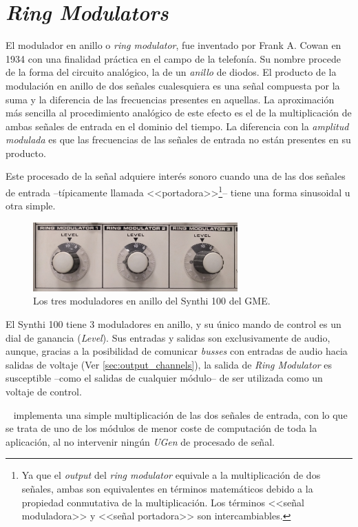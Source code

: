 \section[Ring Modulators]{\textit{Ring Modulators}}
\label{sec:ring_modulators}

El modulador en anillo o \textit{ring modulator}, fue inventado por Frank A. Cowan en 1934 con una finalidad práctica en el campo de la telefonía. Su nombre procede de la forma del circuito analógico, la de un \textit{anillo} de diodos. El producto de la modulación en anillo de dos señales cualesquiera es una señal compuesta por la suma y la diferencia de las frecuencias presentes en aquellas. La aproximación más sencilla al procedimiento analógico de este efecto es el de la multiplicación de ambas señales de entrada en el dominio del tiempo. La diferencia con la \textit{amplitud modulada} es que las frecuencias de las señales de entrada no están presentes en su producto. 

Este procesado de la señal adquiere interés sonoro cuando una de las dos señales de entrada --típicamente llamada <<portadora>>\footnote{Ya que el \textit{output} del \textit{ring modulator} equivale a la multiplicación de dos señales, ambas son equivalentes en términos matemáticos debido a la propiedad conmutativa de la multiplicación. Los términos <<señal moduladora>> y <<señal portadora>> son intercambiables.}-- tiene una forma sinusoidal u otra simple. 

\begin{figure}
	\centering
	\includegraphics[width=0.7\textwidth]{images/ring_modulators}
	\caption[\textit{Ring Modulators}]{Los tres moduladores en anillo del Synthi 100 del GME.}
	\label{fig:ring_modulators}
\end{figure}

El Synthi 100 tiene 3 moduladores en anillo, y su único mando de control es un dial de ganancia (\textit{Level}). Sus entradas y salidas son exclusivamente de audio, aunque, gracias a la posibilidad de comunicar \textit{busses} con entradas de audio hacia salidas de voltaje (Ver \ref{sec:output_channels}), la salida de \textit{Ring Modulator} es susceptible --como el salidas de cualquier módulo-- de ser utilizada como un voltaje de control.

\appName~ implementa una simple multiplicación de las dos señales de entrada, con lo que se trata de uno de los módulos de menor coste de computación de toda la aplicación, al no intervenir ningún \textit{UGen} de procesado de señal.